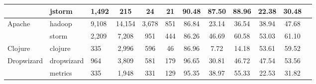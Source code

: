 \begin{table}
{\begin{tabular}{lllccccccccc}
                            & jstorm                                                        & 1,492           & 215              & 24                                                               & 21             & 90.48          & 87.50          & 88.96          & 22.38                                                             & 30.48                                                              \\ \hline
\multirow{2}{*}{Apache}     & hadoop                                                        & 9,108           & 14,154           & 3,678                                                            & 851            & 86.84          & 23.14          & 36.54          & 38.94                                                             & 47.68                                                              \\
                            & storm                                                         & 2,209           & 7,208            & 951                                                              & 444            & 86.26          & 46.69          & 60.58          & 53.03                                                             & 61.10                                                              \\ \hline
Clojure                     & clojure                                                       & 335             & 2,996            & 596                                                              & 46             & 86.96          & 7.72           & 14.18          & 53.61                                                             & 59.52                                                              \\ \hline
\multirow{2}{*}{Dropwizard} & dropwizard                                                    & 964             & 3,809            & 581                                                              & 179            & 96.65          & 30.81          & 46.72          & 47.54                                                             & 53.56                                                              \\
                            & metrics                                                       & 335             & 1,948            & 331                                                              & 129            & 95.35          & 38.97          & 55.33          & 22.53                                                             & 31.82                                                              \\ \hline

\end{tabular}}
\end{table}
